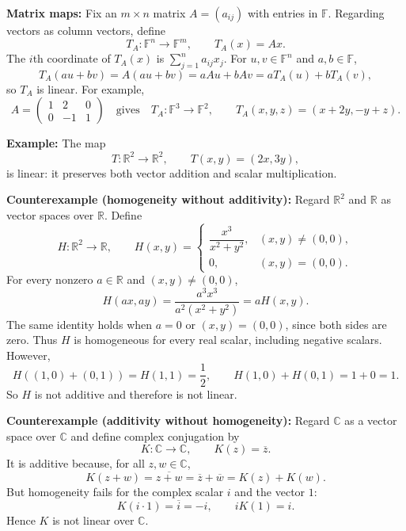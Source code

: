 \documentclass[a4paper,11pt,abstract=true]{scrartcl}
\theoremstyle{dotlessP}
\theoremstyle{dotlessS}
\theoremstyle{remark}
\theoremstyle{definition}
\begin{document}
\begin{claim_box}
\textbf{Matrix maps:} Fix an $m\times n$ matrix
$A=(a_{ij})$ with entries in $\mathbb{F}$. Regarding vectors as column
vectors, define
\[
T_A:\mathbb{F}^n\longrightarrow\mathbb{F}^m,
\qquad T_A(x)=Ax.
\]
The $i$th coordinate of $T_A(x)$ is $\sum_{j=1}^n a_{ij}x_j$.
For $u,v\in\mathbb{F}^n$ and $a,b\in\mathbb{F}$,
\[
T_A(au+bv)=A(au+bv)=aAu+bAv=aT_A(u)+bT_A(v),
\]
so $T_A$ is linear. For example,
\[
A=\begin{pmatrix}1&2&0\\0&-1&1\end{pmatrix}
\quad\text{gives}\quad
T_A:\mathbb{F}^3\longrightarrow\mathbb{F}^2,
\qquad T_A(x,y,z)=(x+2y,-y+z).
\]
\end{claim_box}

\begin{example_box}
\textbf{Example:} The map
\[
T:\mathbb{R}^2\longrightarrow\mathbb{R}^2,
\qquad T(x,y)=(2x,3y),
\]
is linear: it preserves both vector addition and scalar multiplication.
\end{example_box}

\begin{claim_box}
\textbf{Counterexample (homogeneity without additivity):} Regard
$\mathbb{R}^2$ and $\mathbb{R}$ as vector spaces over $\mathbb{R}$. Define
\[
H:\mathbb{R}^2\longrightarrow\mathbb{R},
\qquad
H(x,y)=
\begin{cases}
\dfrac{x^3}{x^2+y^2}, & (x,y)\neq(0,0),\\[4pt]
0, & (x,y)=(0,0).
\end{cases}
\]
For every nonzero $a\in\mathbb{R}$ and $(x,y)\neq(0,0)$,
\[
H(ax,ay)=\frac{a^3x^3}{a^2(x^2+y^2)}=aH(x,y).
\]
The same identity holds when $a=0$ or $(x,y)=(0,0)$, since both sides
are zero. Thus $H$ is homogeneous for every real scalar, including
negative scalars. However,
\[
H((1,0)+(0,1))=H(1,1)=\frac12,
\qquad H(1,0)+H(0,1)=1+0=1.
\]
So $H$ is not additive and therefore is not linear.
\end{claim_box}

\begin{claim_box}
\textbf{Counterexample (additivity without homogeneity):} Regard
$\mathbb{C}$ as a vector space over $\mathbb{C}$ and define complex
conjugation by
\[
K:\mathbb{C}\longrightarrow\mathbb{C},
\qquad K(z)=\overline{z}.
\]
It is additive because, for all $z,w\in\mathbb{C}$,
\[
K(z+w)=\overline{z+w}=\overline{z}+\overline{w}=K(z)+K(w).
\]
But homogeneity fails for the complex scalar $i$ and the vector $1$:
\[
K(i\cdot1)=\overline{i}=-i,
\qquad iK(1)=i.
\]
Hence $K$ is not linear over $\mathbb{C}$.
\end{claim_box}
\end{document}
